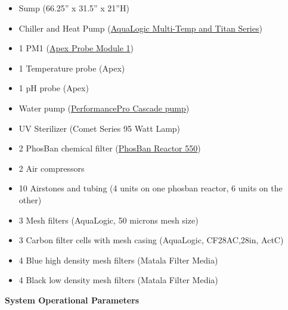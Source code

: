 \documentclass[
]{book}
\providecommand{\tightlist}{%
  \setlength{\itemsep}{0pt}\setlength{\parskip}{0pt}}
\begin{document}
\begin{itemize}
\tightlist
\item
  Sump (66.25'' x 31.5'' x 21''H)\\
\item
  Chiller and Heat Pump (\href{https://github.com/SilbigerLab/Mesocosm_User_Manual/blob/master/Manuals/AquaLogic_Chiller.pdf}{AquaLogic Multi-Temp and Titan Series})\\
\item
  1 PM1 (\href{https://github.com/SilbigerLab/Mesocosm_User_Manual/blob/master/Manuals/PM1_manual.pdf}{Apex Probe Module 1})\\
\item
  1 Temperature probe (Apex)\\
\item
  1 pH probe (Apex)
\item
  Water pump (\href{https://github.com/SilbigerLab/Mesocosm_User_Manual/blob/master/Manuals/Complete_Cascade.pdf}{PerformancePro Cascade pump})\\
\item
  UV Sterilizer (Comet Series 95 Watt Lamp)\\
\item
  2 PhosBan chemical filter (\href{https://github.com/SilbigerLab/Mesocosm_User_Manual/blob/master/Manuals/Phosban_Reactor.pdf}{PhosBan Reactor 550})\\
\item
  2 Air compressors\\
\item
  10 Airstones and tubing (4 units on one phosban reactor, 6 units on the other)\\
\item
  3 Mesh filters (AquaLogic, 50 microns mesh size)\\
\item
  3 Carbon filter cells with mesh casing (AquaLogic, CF28AC,28in, ActC)\\
\item
  4 Blue high density mesh filters (Matala Filter Media)\\
\item
  4 Black low density mesh filters (Matala Filter Media)
\end{itemize}

\textbf{System Operational Parameters}
\end{document}
